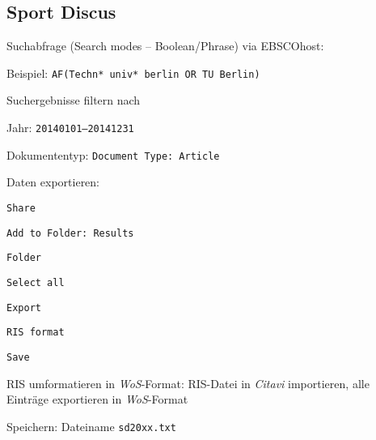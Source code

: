 \subsection*{Sport Discus}
\begin{compactitem}
\item Suchabfrage (Search modes -- Boolean/Phrase) via EBSCOhost: 
	\begin{compactitem}
	\item Beispiel: \texttt{AF(Techn* univ* berlin OR TU Berlin)}
	\end{compactitem}
\item Suchergebnisse filtern nach
	\begin{compactitem}
    \item Jahr: \texttt{20140101--20141231}
    \item Dokumententyp: \texttt{Document Type: Article}
    \end{compactitem}
\item Daten exportieren: 
	\begin{compactitem}
	\item \texttt{Share}
    \item \texttt{Add to Folder: Results}
    \item \texttt{Folder}
    \item \texttt{Select all}
    \item \texttt{Export}
    \item \texttt{RIS format}
    \item \texttt{Save}
	\end{compactitem}
\item RIS umformatieren in \textit{WoS}-Format: RIS-Datei in \textit{Citavi} importieren, alle Einträge exportieren in \textit{WoS}-Format
\item Speichern: Dateiname \texttt{sd20xx.txt}
\end{compactitem}

